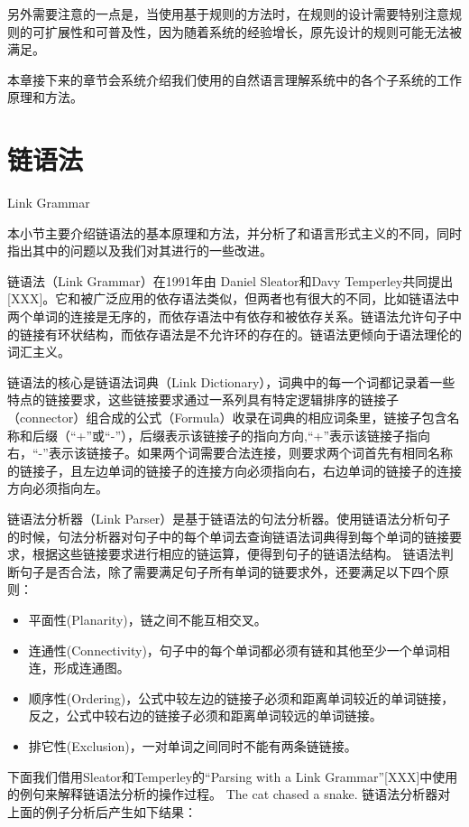 另外需要注意的一点是，当使用基于规则的方法时，在规则的设计需要特别注意规则的可扩展性和可普及性，因为随着系统的经验增长，原先设计的规则可能无法被满足。

本章接下来的章节会系统介绍我们使用的自然语言理解系统中的各个子系统的工作原理和方法。

\section{链语法}{Link Grammar}

本小节主要介绍链语法的基本原理和方法，并分析了和语言形式主义的不同，同时指出其中的问题以及我们对其进行的一些改进。

链语法（Link Grammar）在1991年由 Daniel Sleator和Davy Temperley共同提出[XXX]。它和被广泛应用的依存语法类似，但两者也有很大的不同，比如链语法中两个单词的连接是无序的，而依存语法中有依存和被依存关系。链语法允许句子中的链接有环状结构，而依存语法是不允许环的存在的。链语法更倾向于语法理伦的词汇主义。

链语法的核心是链语法词典（Link Dictionary），词典中的每一个词都记录着一些特点的链接要求，这些链接要求通过一系列具有特定逻辑排序的链接子（connector）组合成的公式（Formula）收录在词典的相应词条里，链接子包含名称和后缀（“+”或“-”），后缀表示该链接子的指向方向,“+”表示该链接子指向右，“-”表示该链接子。如果两个词需要合法连接，则要求两个词首先有相同名称的链接子，且左边单词的链接子的连接方向必须指向右，右边单词的链接子的连接方向必须指向左。

链语法分析器（Link Parser）是基于链语法的句法分析器。使用链语法分析句子的时候，句法分析器对句子中的每个单词去查询链语法词典得到每个单词的链接要求，根据这些链接要求进行相应的链运算，便得到句子的链语法结构。 链语法判断句子是否合法，除了需要满足句子所有单词的链要求外，还要满足以下四个原则：

\begin{itemize}
\item 平面性(Planarity)，链之间不能互相交叉。
\item 连通性(Connectivity)，句子中的每个单词都必须有链和其他至少一个单词相连，形成连通图。
\item 顺序性(Ordering)，公式中较左边的链接子必须和距离单词较近的单词链接，反之，公式中较右边的链接子必须和距离单词较远的单词链接。
\item 排它性(Exclusion)，一对单词之间同时不能有两条链链接。
\end{itemize}

下面我们借用Sleator和Temperley的“Parsing with a Link Grammar”[XXX]中使用的例句来解释链语法分析的操作过程。
The cat chased a snake.
链语法分析器对上面的例子分析后产生如下结果：
 
